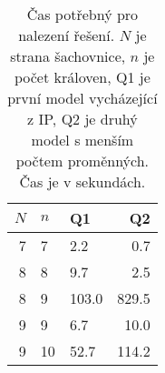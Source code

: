 \documentclass[11pt]{article}
\begin{document}
\begin{table}
\begin{center}
\begin{tabular}{|r|l|l|r|}
    \hline
    $N$ & $n$ & Q1      & Q2 \\
    \hline
    \hline
    7   & 7   & 2.2     & 0.7 \\
    \hline
    8   & 8   & 9.7     & 2.5 \\
    \hline
    8   & 9   & 103.0   & 829.5 \\
    \hline
    9   & 9   & 6.7     & 10.0 \\
    \hline
    9   & 10  & 52.7    & 114.2  \\
    \hline
\end{tabular}
\caption{Čas potřebný pro nalezení řešení. $N$ je strana šachovnice, $n$ je
počet královen, Q1 je první model vycházející z IP, Q2 je druhý model s menším
počtem proměnných. Čas je v sekundách.}
\end{center}
\end{table}
\end{document}
